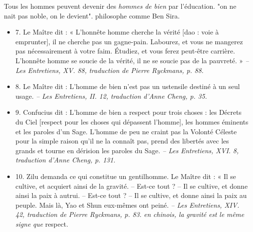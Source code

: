 \begin{Synthesis}
    Tous les hommes peuvent devenir des \textit{hommes de bien} par l'éducation.  "on ne nait pas noble, on le devient". 
    philosophe comme Ben Sira.
\end{Synthesis}
\begin{itemize}
    
\item 7. \newline Le Maître dit : « L’honnête homme cherche la vérité [dao : voie à emprunter], il ne cherche pas un gagne-pain. Labourez, et vous ne mangerez pas nécessairement à votre faim. Étudiez, et vous ferez peut-être carrière. L’honnête homme se soucie de la vérité, il ne se soucie pas de la pauvreté. » \textit{\small -- Les Entretiens, XV. 88, traduction de Pierre Ryckmans, p. 88. } 
\item 8. \newline Le Maître dit : L’homme de bien n’est pas un ustensile destiné à un seul usage. \textit{\small -- Les Entretiens, II. 12, traduction d’Anne Cheng, p. 35.  }
\item 9. \newline Confucius dit  : L’homme de bien a respect pour trois choses : les Décrets du Ciel [respect pour les choses qui dépassent l'homme], les hommes éminents et les paroles d’un Sage. L’homme de peu ne craint pas la Volonté Céleste pour la simple raison qu’il ne la connaît pas, prend des libertés avec les grands et tourne en dérision les paroles du Sage. \textit{\small -- Les Entretiens, XVI. 8, traduction d’Anne Cheng, p. 131. }
\item 10. \newline Zilu demanda ce qui constitue un gentilhomme. \newline Le Maître dit : « Il se cultive, et acquiert ainsi de la gravité. – Est-ce tout ? – Il se cultive, et donne ainsi la paix à autrui. – Est-ce tout ? – Il se cultive, et donne ainsi la paix au peuple. Mais là, Yao et Shun eux-mêmes ont peiné. \textit{\small -- Les Entretiens, XIV. 42, traduction de Pierre Ryckmans, p. 83.  }
\textit{en chinois, la gravité est le même signe que }respect.



\end{itemize}
